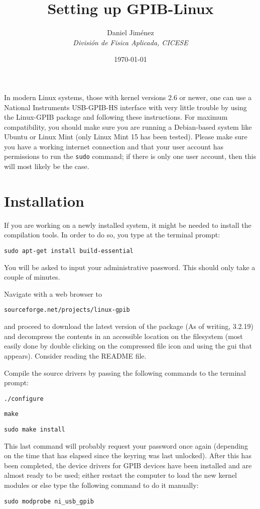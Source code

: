 \documentclass[letterpaper,11pt]{article}
\begin{document}
\date{\today}

\title{Setting up GPIB-Linux}
\author{Daniel Jim\'enez\\\emph{Divisi\'on de Fisica Aplicada, CICESE}}
\maketitle


In modern Linux systems, those with kernel versions 2.6 or newer, one can use a National Instruments USB-GPIB-HS interface with very little trouble by using the Linux-GPIB package and following these instructions. For maximum compatibility, you should make sure you are running a Debian-based system like Ubuntu or Linux Mint (only Linux Mint 15 has been tested). Please make sure you have a working internet connection and that your user account has permissions to run the \texttt{sudo} command; if there is only one user account, then this will most likely be the case.

\section{Installation}
If you are working on a newly installed system, it might be needed to install the compilation tools. In order to do so, you type at the terminal prompt:
 \begin{verbatim}
sudo apt-get install build-essential
 \end{verbatim}
You will be asked to input your administrative password. This should only take a couple of minutes.

Navigate with a web browser to 
 \begin{verbatim}
sourceforge.net/projects/linux-gpib
 \end{verbatim}
and proceed to download the latest version of the package (As of writing, 3.2.19) and decompress the contents in an accessible location on the filesystem (most easily done by double clicking on the compressed file icon and using the gui that appears). Consider reading the README file.

Compile the source drivers by passing the following commands to the terminal prompt:
 \begin{verbatim}
./configure
 \end{verbatim}
 \begin{verbatim}
make
 \end{verbatim}
 \begin{verbatim}
sudo make install
 \end{verbatim}
This last command will probably request your password once again (depending on the time that has elapsed since the keyring was last unlocked). After this has been completed, the device drivers for GPIB devices have been installed and are almost ready to be used; either restart the computer to load the new kernel modules or else type the following command to do it manually:
 \begin{verbatim}
sudo modprobe ni_usb_gpib
 \end{verbatim}
\end{document}
